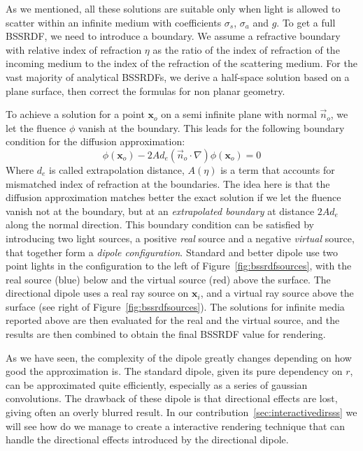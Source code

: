 %
As we mentioned, all these solutions are suitable only when light is allowed to scatter within an infinite medium with coefficients $\sigma_s$, $\sigma_a$ and $g$. To get a full BSSRDF, we need to introduce a boundary. We assume a refractive boundary with relative index of refraction $\eta$ as the ratio of the index of refraction of the incoming medium to the index of the refraction of the scattering medium. For the vast majority of analytical BSSRDFs, we derive a half-space solution based on a plane surface, then correct the formulas for non planar geometry.

To achieve a solution for a point $\mathbf{x}_o$ on a semi infinite plane with normal $\vec{n}_o$, we let the fluence $\phi$ vanish at the boundary. This leads for the following boundary condition for the diffusion approximation: 
\begin{equation*}
\phi(\mathbf{x}_o) - 2 A d_e (\vec{n}_o \cdot \nabla) \phi(\mathbf{x}_o) = 0
\end{equation*}
Where $d_e$ is called extrapolation distance, $A(\eta)$ is a term that accounts for mismatched index of refraction at the boundaries. The idea here is that the diffusion approximation matches better the exact solution if we let the fluence vanish not at the boundary, but at an \emph{extrapolated boundary} at distance $2 A d_e$ along the normal direction. This boundary condition can be satisfied by introducing two light sources, a positive \emph{real} source and a negative \emph{virtual} source, that together form a \emph{dipole configuration}.  Standard and better dipole use two point lights in the configuration to the left of Figure~\ref{fig:bssrdfsources}, with the real source (blue) below and the virtual source (red) above the surface. The directional dipole uses a real ray source on $\mathbf{x}_i$, and a virtual ray source above the surface (see right of Figure~\ref{fig:bssrdfsources}). The solutions for infinite media reported above are then evaluated for the real and the virtual source, and the results are then combined to obtain the final BSSRDF value for rendering. 

As we have seen, the complexity of the dipole greatly changes depending on how good the approximation is. The standard dipole, given its pure dependency on $r$, can be approximated quite efficiently, especially as a series of gaussian convolutions. The drawback of these dipole is that directional effects are lost, giving often an overly blurred result. In our contribution~\ref{sec:interactivedirsss} we will see how do we manage to create a interactive rendering technique that can handle the directional effects introduced by the directional dipole.

